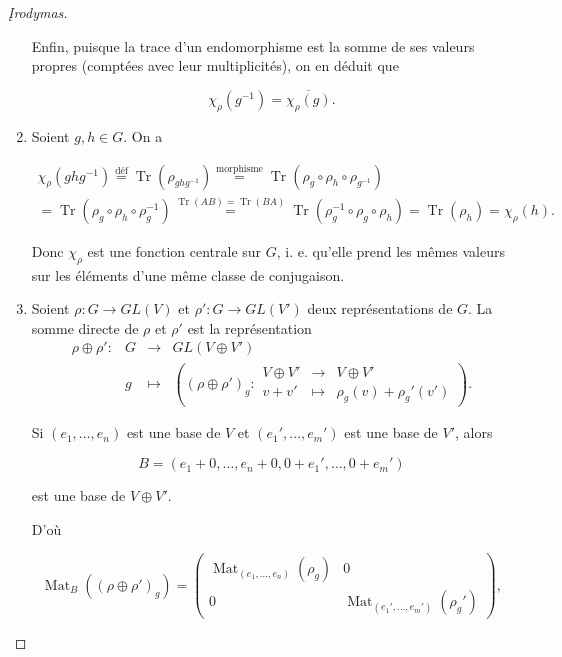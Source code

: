 \documentclass[french]{book}
\theoremstyle{definition}
\begin{document}
\begin{proof}[\k{I}rodymas]
\begin{enumerate}
    Enfin, puisque la trace d'un endomorphisme est la somme de ses valeurs propres (comptées avec leur multiplicités), on en déduit que

    \[\chi _{\rho}(g ^{-1}) = \overline{\chi _{\rho}(g)}. \]

    \item Soient \(g, h \in G\). On a

    \begin{gather*}
      \chi _{\rho}(g h g ^{-1}) \stackrel{\text{déf}}{=} \operatorname{Tr}(\rho _{ghg ^{-1}}) \stackrel{\text{morphisme}}{=} \operatorname{Tr}(\rho_g \circ \rho_h \circ \rho _{g ^{-1}}) \\
      = \operatorname{Tr}(\rho_g \circ \rho_h \circ \rho_g ^{-1}) \stackrel{\operatorname{Tr}(AB) = \operatorname{Tr}(BA)}{=} \operatorname{Tr}(\rho_g ^{-1} \circ \rho_g \circ \rho_h) = \operatorname{Tr}(\rho_h) = \chi _{\rho}(h).
    \end{gather*}

    Donc \(\chi _{\rho}\) est une fonction centrale sur \(G\), i. e. qu'elle prend les mêmes valeurs sur les éléments d'une même classe de conjugaison.

    \item Soient \(\rho : G \longrightarrow GL(V)\) et \(\rho' : G \longrightarrow GL(V')\) deux représentations de \(G\). La somme directe de \(\rho\) et \(\rho'\) est la représentation
     \[\begin{matrix}
      \rho \oplus \rho' : & G & \longrightarrow & GL(V \oplus V') \\
      \ & g & \longmapsto & \left( (\rho \oplus \rho')_g  : \begin{matrix}
      V \oplus V' & \longrightarrow & V \oplus V' \\
      v + v' & \longmapsto & \rho_g(v) + \rho_g'(v')
      \end{matrix}\right).
      \end{matrix}\]

      Si \((e_1, \dots, e_n)\) est une base de \(V\) et \((e_1', \dots, e_m')\) est une base de \(V'\), alors

      \[B = (e_1+0, \dots, e_n+0, 0 + e_1', \dots, 0 + e_m')\]

      est une base de \(V \oplus V'\).

      D'où

      \[\operatorname{Mat}_B((\rho \oplus \rho')_g) = \begin{pmatrix}
      \operatorname{Mat} _{(e_1, \dots, e_n)}(\rho_g) & 0 \\
      0 & \operatorname{Mat} _{(e_1', \dots, e_m')}(\rho_g')
      \end{pmatrix}, \]


\end{enumerate}
\end{proof}
\end{document}
